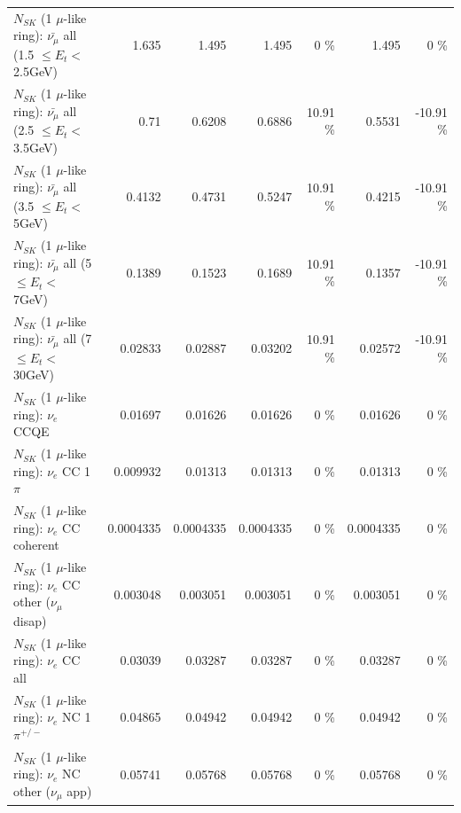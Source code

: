 \begin{table}
\begin{tabular}{| l | r | r | r  r | r  r |}
 $N_{SK}$ (1 $\mu$-like ring): $\bar{\nu_{\mu}}$ all (1.5 $\leq E_{t} <$ 2.5GeV) &           1.635 &           1.495 &           1.495 &        0 \%  &           1.495 &        0 \%  \\ 
 $N_{SK}$ (1 $\mu$-like ring): $\bar{\nu_{\mu}}$ all (2.5 $\leq E_{t} <$ 3.5GeV) &            0.71 &          0.6208 &          0.6886 &    10.91 \%  &          0.5531 &   -10.91 \%  \\ 
   $N_{SK}$ (1 $\mu$-like ring): $\bar{\nu_{\mu}}$ all (3.5 $\leq E_{t} <$ 5GeV) &          0.4132 &          0.4731 &          0.5247 &    10.91 \%  &          0.4215 &   -10.91 \%  \\ 
     $N_{SK}$ (1 $\mu$-like ring): $\bar{\nu_{\mu}}$ all (5 $\leq E_{t} <$ 7GeV) &          0.1389 &          0.1523 &          0.1689 &    10.91 \%  &          0.1357 &   -10.91 \%  \\ 
    $N_{SK}$ (1 $\mu$-like ring): $\bar{\nu_{\mu}}$ all (7 $\leq E_{t} <$ 30GeV) &         0.02833 &         0.02887 &         0.03202 &    10.91 \%  &         0.02572 &   -10.91 \%  \\ 
\hline
\hline
\hline
                                      $N_{SK}$ (1 $\mu$-like ring): $\nu_e$ CCQE &         0.01697 &         0.01626 &         0.01626 &        0 \%  &         0.01626 &        0 \%  \\ 
                                 $N_{SK}$ (1 $\mu$-like ring): $\nu_e$ CC 1$\pi$ &        0.009932 &         0.01313 &         0.01313 &        0 \%  &         0.01313 &        0 \%  \\ 
                               $N_{SK}$ (1 $\mu$-like ring): $\nu_e$ CC coherent &       0.0004335 &       0.0004335 &       0.0004335 &        0 \%  &       0.0004335 &        0 \%  \\ 
                $N_{SK}$ (1 $\mu$-like ring): $\nu_e$ CC other ($\nu_\mu$ disap) &        0.003048 &        0.003051 &        0.003051 &        0 \%  &        0.003051 &        0 \%  \\ 
                                  $N_{SK}$ (1 $\mu$-like ring): $\nu_{e}$ CC all &         0.03039 &         0.03287 &         0.03287 &        0 \%  &         0.03287 &        0 \%  \\ 
\hline
                           $N_{SK}$ (1 $\mu$-like ring): $\nu_e$ NC 1$\pi^{+/-}$ &         0.04865 &         0.04942 &         0.04942 &        0 \%  &         0.04942 &        0 \%  \\ 
                  $N_{SK}$ (1 $\mu$-like ring): $\nu_e$ NC other ($\nu_\mu$ app) &         0.05741 &         0.05768 &         0.05768 &        0 \%  &         0.05768 &        0 \%  \\ 

\end{tabular}
\end{table}
